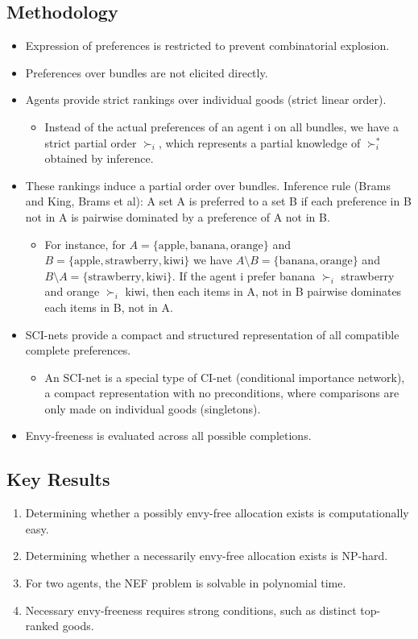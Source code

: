\documentclass[12pt,a4paper]{article}
\begin{document}
\subsection*{Methodology}
\begin{itemize}
    \item Expression of preferences is restricted to prevent combinatorial explosion.
    \item Preferences over bundles are not elicited directly.
    \item Agents provide strict rankings over individual goods (strict linear order).
    \begin{itemize}
        \item Instead of the actual preferences of an agent i on all bundles, we have a strict partial order  $\succ_i$, which represents a partial knowledge of  $\succ_i^*$ obtained by inference.
    \end{itemize}
    \item These rankings induce a partial order over bundles. Inference rule (Brams and King, Brams et al): A set A is preferred to a set B if each preference in B not in A is pairwise dominated by a preference of A not in B.
    \begin{itemize}
        \item For instance, for $A = \{\text{apple},\text{banana},\text{orange}\}$ and $B = \{\text{apple},\text{strawberry},\text{kiwi}\}$ we have $A \setminus B = \{\text{banana},\text{orange} \}$ and $B \setminus A = \{\text{strawberry},\text{kiwi} \}$. If the agent i prefer banana  $\succ_i$ strawberry and orange  $\succ_i$ kiwi, then each items in A, not in B pairwise dominates each items in B, not in A.
    \end{itemize}
    \item SCI-nets provide a compact and structured representation of all compatible complete preferences.
    \begin{itemize}
        \item An SCI-net is a special type of CI-net (conditional importance network), a compact representation with no preconditions, where comparisons are only made on individual goods (singletons).
    \end{itemize}
    \item Envy-freeness is evaluated across all possible completions.
\end{itemize}

\subsection*{Key Results}
\begin{enumerate}
    \item Determining whether a possibly envy-free allocation exists is computationally easy.
    \item Determining whether a necessarily envy-free allocation exists is NP-hard.
    \item For two agents, the NEF problem is solvable in polynomial time.
    \item Necessary envy-freeness requires strong conditions, such as distinct top-ranked goods.
\end{enumerate}
\end{document}
